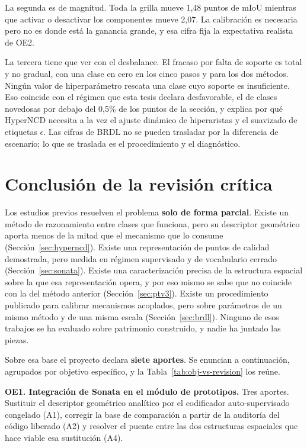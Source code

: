 La segunda es de magnitud. Toda la grilla mueve 1,48 puntos de mIoU mientras que
activar o desactivar los componentes mueve 2,07. La calibración es necesaria pero
no es donde está la ganancia grande, y esa cifra fija la expectativa realista de
OE2.

La tercera tiene que ver con el desbalance. El fracaso por falta de soporte es
total y no gradual, con una clase en cero en los cinco pasos y para los dos métodos.
Ningún valor de hiperparámetro rescata una clase cuyo soporte es insuficiente.
Eso coincide con el régimen que esta tesis declara desfavorable, el de clases
novedosas por debajo del 0,5\% de los puntos de la sección, y explica por qué
HyperNCD necesita a la vez el ajuste dinámico de hiperaristas y el suavizado de
etiquetas $\epsilon$. Las cifras de BRDL no se pueden trasladar por la diferencia
de escenario; lo que se traslada es el procedimiento y el diagnóstico.

\section[Conclusión: aportes del proyecto]{Conclusión de la revisión crítica}
\label{sec:aporte}

Los estudios previos resuelven el problema \textbf{solo de forma parcial}. Existe
un método de razonamiento entre clases que funciona, pero su descriptor
geométrico aporta menos de la mitad que el mecanismo que lo consume
(Sección~\ref{sec:hyperncd}). Existe una representación de puntos de calidad
demostrada, pero medida en régimen supervisado y de vocabulario cerrado
(Sección~\ref{sec:sonata}). Existe una caracterización precisa de la estructura
espacial sobre la que esa representación opera, y por eso mismo se sabe que no
coincide con la del método anterior (Sección~\ref{sec:ptv3}). Existe un
procedimiento publicado para calibrar mecanismos acoplados, pero sobre parámetros
de un mismo método y de una misma escala (Sección~\ref{sec:brdl}). Ninguno de
esos trabajos se ha evaluado sobre patrimonio construido, y nadie ha juntado las
piezas.

Sobre esa base el proyecto declara \textbf{siete aportes}. Se enuncian a
continuación, agrupados por objetivo específico, y la
Tabla~\ref{tab:obj-vs-revision} los reúne.

\medskip
\noindent\textbf{OE1. Integración de Sonata en el módulo de prototipos.}
Tres aportes. Sustituir el descriptor geométrico analítico por el codificador
auto-supervisado congelado (A1), corregir la base de comparación a partir de la
auditoría del código liberado (A2) y resolver el puente entre las dos estructuras
espaciales que hace viable esa sustitución (A4).

